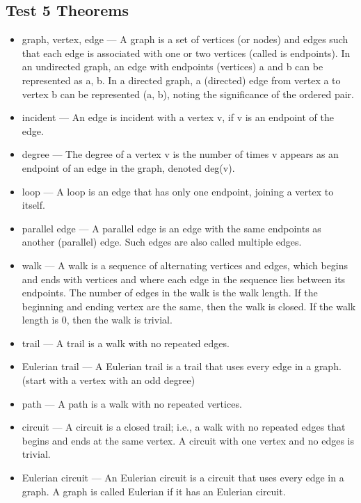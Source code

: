 \documentclass[8pt]{article}
\begin{document}
\begin{paracol}{3}
        \subsection*{Test 5 Theorems}
        \begin{itemize}[noitemsep]
            \item graph, vertex, edge — A graph is a set of vertices (or nodes) and edges such that each edge is associated with one or two vertices (called is endpoints). In an undirected graph, an edge with endpoints (vertices) a and b can be represented as {a, b}. In a directed graph, a (directed) edge from vertex a to vertex b can be represented (a, b), noting the significance of the ordered pair.
            \item incident — An edge is incident with a vertex v, if v is an endpoint of the edge.
            \item degree — The degree of a vertex v is the number of times v appears as an endpoint of an edge in the graph, denoted deg(v).
            \item loop — A loop is an edge that has only one endpoint, joining a vertex to itself.
            \item parallel edge — A parallel edge is an edge with the same endpoints as another (parallel) edge. Such edges are also called multiple edges.
            \item  walk — A walk is a sequence of alternating vertices and edges, which begins and ends with vertices and where each edge in the sequence lies between its endpoints. The number of edges in the walk is the walk length. If the beginning and ending vertex are the same, then the walk is closed. If the walk length is 0, then the walk is trivial.
            \item  trail — A trail is a walk with no repeated edges.
            \item  Eulerian trail — A Eulerian trail is a trail that uses every edge in a graph. (start with a vertex with an odd degree)
            \item  path — A path is a walk with no repeated vertices.
            \item  circuit — A circuit is a closed trail; i.e., a walk with no repeated edges that begins and ends at the same vertex. A circuit with one vertex and no edges is trivial.
            \switchcolumn
            \item  Eulerian circuit — An Eulerian circuit is a circuit that uses every edge in a graph. A graph is called Eulerian if it has an Eulerian circuit.

\end{itemize}
\end{paracol}
\end{document}
